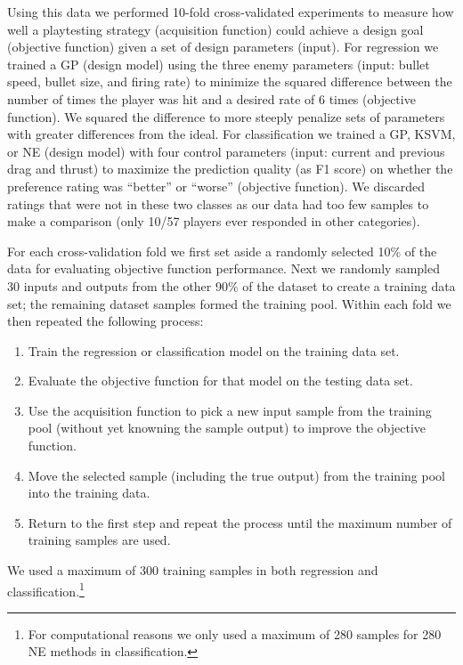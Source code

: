 \documentclass{sig-alternate}
\begin{document}
Using this data we performed 10-fold cross-validated experiments to measure how well a playtesting strategy (acquisition function) could achieve a design goal (objective function) given a set of design parameters (input).
For regression we trained a GP (design model) using the three enemy parameters (input: bullet speed, bullet size, and firing rate) to minimize the squared difference between the number of times the player was hit and a desired rate of 6 times (objective function).
We squared the difference to more steeply penalize sets of parameters with greater differences from the ideal.
For classification we trained a GP, KSVM, or NE (design model) with four control parameters (input: current and previous drag and thrust) to maximize the prediction quality (as F1 score) on whether the preference rating was ``better'' or ``worse'' (objective function).
We discarded ratings that were not in these two classes as our data had too few samples to make a comparison (only 10/57 players ever responded in other categories).


For each cross-validation fold we first set aside a randomly selected 10\% of the data for evaluating objective function performance.
Next we randomly sampled 30 inputs and outputs from the other 90\% of the dataset to create a training data set; the remaining dataset samples formed the training pool.
Within each fold we then repeated the following process:
\begin{enumerate}
\item Train the regression or classification model on the training data set.
\item Evaluate the objective function for that model on the testing data set.
\item Use the acquisition function to pick a new input sample from the training pool (without yet knowning the sample output) to improve the objective function.
\item Move the selected sample (including the true output) from the training pool into the training data.
\item Return to the first step and repeat the process until the maximum number of training samples are used.
\end{enumerate}
\noindent We used a maximum of 300 training samples in both regression and classification.\footnote{For computational reasons we only used a maximum of 280 samples for 280 NE methods in classification.}
\end{document}
